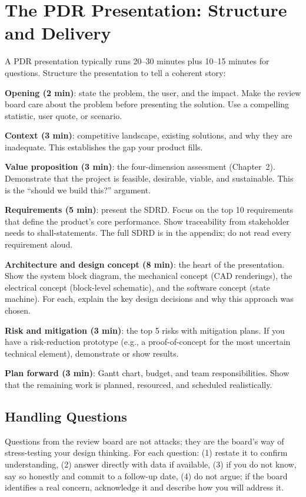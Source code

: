 \section{The PDR Presentation: Structure and Delivery}
A PDR presentation typically runs 20--30 minutes plus 10--15 minutes for questions. Structure the presentation to tell a coherent story:

\textbf{Opening (2 min)}: state the problem, the user, and the impact. Make the review board care about the problem before presenting the solution. Use a compelling statistic, user quote, or scenario.

\textbf{Context (3 min)}: competitive landscape, existing solutions, and why they are inadequate. This establishes the gap your product fills.

\textbf{Value proposition (3 min)}: the four-dimension assessment (Chapter~2). Demonstrate that the project is feasible, desirable, viable, and sustainable. This is the ``should we build this?'' argument.

\textbf{Requirements (5 min)}: present the SDRD. Focus on the top 10 requirements that define the product's core performance. Show traceability from stakeholder needs to shall-statements. The full SDRD is in the appendix; do not read every requirement aloud.

\textbf{Architecture and design concept (8 min)}: the heart of the presentation. Show the system block diagram, the mechanical concept (CAD renderings), the electrical concept (block-level schematic), and the software concept (state machine). For each, explain the key design decisions and why this approach was chosen.

\textbf{Risk and mitigation (3 min)}: the top 5 risks with mitigation plans. If you have a risk-reduction prototype (e.g., a proof-of-concept for the most uncertain technical element), demonstrate or show results.

\textbf{Plan forward (3 min)}: Gantt chart, budget, and team responsibilities. Show that the remaining work is planned, resourced, and scheduled realistically.

\subsection{Handling Questions}
Questions from the review board are not attacks; they are the board's way of stress-testing your design thinking. For each question: (1) restate it to confirm understanding, (2) answer directly with data if available, (3) if you do not know, say so honestly and commit to a follow-up date, (4) do not argue; if the board identifies a real concern, acknowledge it and describe how you will address it.

